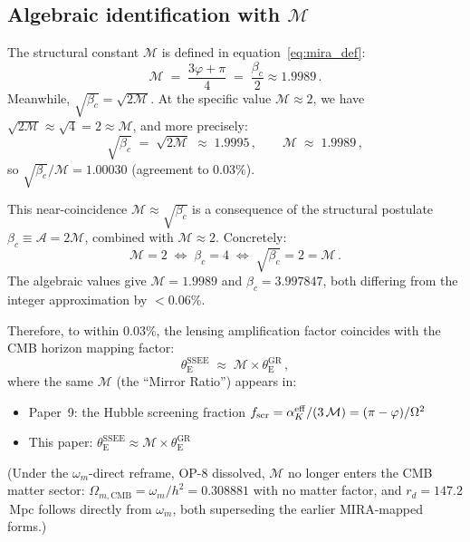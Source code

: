 \documentclass[12pt,a4paper]{article}
\newcommand{\phiG}{\varphi}
\newcommand{\MIRA}{\mathcal{M}}
\newcommand{\AURA}{\mathcal{A}}
\newcommand{\bc}{\beta_c}
\newcommand{\thetaE}{\theta_{\mathrm{E}}}
\begin{document}
\subsection{Algebraic identification with \texorpdfstring{$\MIRA$}{M}}

The structural constant $\MIRA$ is defined in equation~\eqref{eq:mira_def}:
\begin{equation}
  \MIRA \;=\; \frac{3\phiG+\pi}{4} \;=\; \frac{\bc}{2} \approx 1.9989\,.
\end{equation}
Meanwhile, $\sqrt{\bc} = \sqrt{2\MIRA}$.
At the specific value $\MIRA \approx 2$, we have
$\sqrt{2\MIRA} \approx \sqrt{4} = 2 \approx \MIRA$, and
more precisely:
\begin{equation}
  \sqrt{\bc} \;=\; \sqrt{2\MIRA} \;\approx\; 1.9995\,,
  \qquad
  \MIRA \;\approx\; 1.9989\,,
  \label{eq:mira_approx}
\end{equation}
so $\sqrt{\bc}/\MIRA = 1.00030$ (agreement to $0.03\%$).

This near-coincidence $\MIRA \approx \sqrt{\bc}$ is a consequence of the
structural postulate $\bc \equiv \AURA = 2\MIRA$, combined with
$\MIRA \approx 2$.
Concretely:
\begin{equation}
  \MIRA = 2 \;\Longleftrightarrow\; \bc = 4 \;\Longleftrightarrow\;
  \sqrt{\bc} = 2 = \MIRA\,.
\end{equation}
The algebraic values give $\MIRA = 1.9989$ and $\bc = 3.997847$, both
differing from the integer approximation by $<0.06\%$.

Therefore, to within $0.03\%$, the lensing amplification factor coincides
with the CMB horizon mapping factor:
\begin{equation}
  \thetaE^{\mathrm{SSEE}} \;\approx\; \MIRA \times \thetaE^{\mathrm{GR}}\,,
  \label{eq:thetaE_mira}
\end{equation}
where the same $\MIRA$ (the ``Mirror Ratio'') appears in:
\begin{itemize}
  \item Paper~9: the Hubble screening fraction $f_{\rm scr} = \alpha_K^{\rm eff}/(3\,\MIRA) = (\pi-\varphi)/\Omega^2$
  \item This paper: $\thetaE^{\mathrm{SSEE}} \approx \MIRA \times \thetaE^{\mathrm{GR}}$
\end{itemize}
(Under the $\omega_m$-direct reframe, OP-8 dissolved, $\MIRA$ no longer enters
the CMB matter sector: $\Omega_{m,\mathrm{CMB}}=\omega_m/h^2=0.308881$ with no
matter factor, and $r_d=147.2$\,Mpc follows directly from $\omega_m$, both
superseding the earlier MIRA-mapped forms.)
\end{document}
